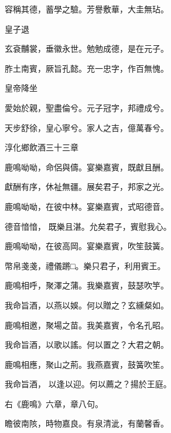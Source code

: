 \begin{pinyinscope}
 容稱其德，蓄學之驗。芳譽敷華，大圭無玷。



 皇子退



 玄袞黼裳，垂徽永世。勉勉成德，是在元子。



 胙土南賓，厥旨孔懿。充一忠字，作百無愧。



 皇帝降坐



 愛始於親，聖盡倫兮。元子冠字，邦禮成兮。



 天步舒徐，皇心寧兮。家人之吉，億萬春兮。



 淳化鄉飲酒三十三章



 鹿鳴呦呦，命侶與儔。宴樂嘉賓，既獻且酬。



 獻酬有序，休祉無疆。展矣君子，邦家之光。



 鹿鳴呦呦，在彼中林。宴樂嘉賓，式昭德音。



 德音愔愔，
 既樂且湛。允矣君子，賓慰我心。



 鹿鳴呦呦，在彼高岡。宴樂嘉賓，吹笙鼓簧。



 幣帛戔戔，禮儀蹡□。樂只君子，利用賓王。



 鹿鳴相呼，聚澤之蒲。我樂嘉賓，鼓瑟吹竽。



 我命旨酒，以燕以娛。何以贈之？玄纁粲如。



 鹿鳴相邀，聚場之苗。我美嘉賓，令名孔昭。



 我命旨酒，以歌以謠。何以置之？大君之朝。



 鹿鳴相應，聚山之荊。我燕嘉賓，鼓簧吹笙。



 我命旨酒，
 以逢以迎。何以薦之？揚於王庭。



 右《鹿鳴》六章，章八句。



 瞻彼南陔，時物嘉良。有泉清泚，有蘭馨香。




\end{pinyinscope}
